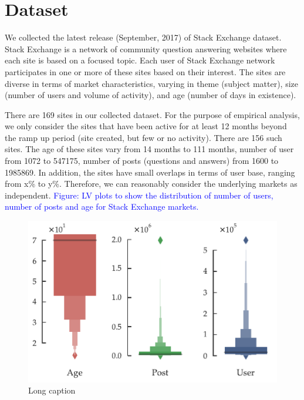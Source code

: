 \section{Dataset} 
We collected the latest release (September, 2017) of Stack Exchange dataset. Stack Exchange is a network of community question answering websites where each site is based on a focused topic. Each user of Stack Exchange network participates in one or more of these sites based on their interest. The sites are diverse in terms of market characteristics, varying in theme (subject matter), size (number of users and volume of activity), and age (number of days in existence). 

There are 169 sites in our collected dataset. For the purpose of empirical analysis, we only consider the sites that have been active for at least 12 months beyond the ramp up period (site created, but few or no activity). There are 156 such sites. The age of these sites vary from 14 months to 111 months, number of user from 1072 to 547175, number of posts (questions and answers) from 1600 to 1985869. In addition, the sites have small overlaps in terms of user base, ranging from x\% to y\%. Therefore, we can reasonably consider the underlying markets as independent. \textcolor{blue}{Figure: LV plots to show the distribution of number of users, number of posts and age for Stack Exchange markets.}

\begin{figure}[hbt]
\centering
\includegraphics[scale=0.45]{Figures/Dataset_Statistics.pdf}
\caption{Long caption}
\end{figure}
